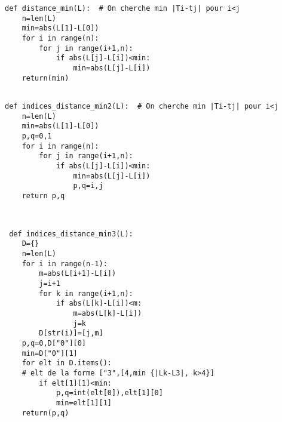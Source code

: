 
\begin{lstlisting}
def distance_min(L):  # On cherche min |Ti-tj| pour i<j
    n=len(L)
    min=abs(L[1]-L[0])
    for i in range(n):
        for j in range(i+1,n):
            if abs(L[j]-L[i])<min:
                min=abs(L[j]-L[i])
    return(min)


\end{lstlisting}



\begin{lstlisting}
def indices_distance_min2(L):  # On cherche min |Ti-tj| pour i<j
    n=len(L)
    min=abs(L[1]-L[0])
    p,q=0,1
    for i in range(n):
        for j in range(i+1,n):
            if abs(L[j]-L[i])<min:
                min=abs(L[j]-L[i])
                p,q=i,j
    return p,q


\end{lstlisting}



 
 
 \begin{lstlisting}
 
 def indices_distance_min3(L):
    D={}
    n=len(L)
    for i in range(n-1):
        m=abs(L[i+1]-L[i])
        j=i+1
        for k in range(i+1,n):
            if abs(L[k]-L[i])<m:
                m=abs(L[k]-L[i])
                j=k
        D[str(i)]=[j,m]
    p,q=0,D["0"][0]
    min=D["0"][1]
    for elt in D.items():
    # elt de la forme ["3",[4,min {|Lk-L3|, k>4}]
        if elt[1][1]<min:
            p,q=int(elt[0]),elt[1][0]
            min=elt[1][1]
    return(p,q)


\end{lstlisting}

